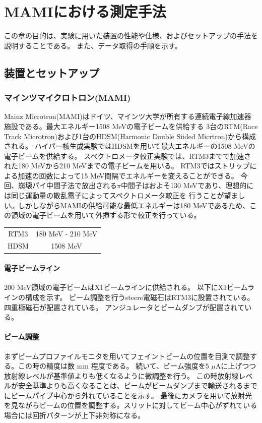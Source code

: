 \documentclass[a4paper,11pt,uplatex]{jsbook}
\begin{document}
\chapter{MAMIにおける測定手法}
この章の目的は、実験に用いた装置の性能や仕様、およびセットアップの手法を説明することである。
また、データ取得の手順を示す。
\section{装置とセットアップ}
\subsection{マインツマイクロトロン(MAMI)}
Mainz Microtron(MAMI)はドイツ、マインツ大学が所有する連続電子線加速器施設である。最大エネルギー1508 MeVの電子ビームを供給する
3台のRTM(Race Track Microtron)および1台のHDSM(Harmonic Double Siided Micrtron)から構成される。
ハイパー核生成実験ではHDSMを用いて最大エネルギーの1508 MeVの電子ビームを供給する。
スペクトロメータ較正実験では、RTM3までで加速された180 MeVから210 MeVまでの電子ビームを用いる。
RTM3ではストリップによる加速の回数によって15 MeV間隔でエネルギーを変えることができる。
今回、崩壊パイ中間子法で放出される$\pi$中間子はおよそ130 MeVであり、理想的には同じ運動量の散乱電子によってスペクトロメータ較正を
行うことが望ましい。しかしながらMAMIの供給可能な最低エネルギーは180 MeVであるため、この領域の電子ビームを用いて外挿する形で較正を行っている。
\begin{table}
  \begin{tabular}{cc}
    \hline
    RTM3 & 180 MeV - 210 MeV \\
    HDSM & 1508 MeV \\
    \hline
  \end{tabular}
\end{table}

\subsubsection{電子ビームライン}
200 MeV領域の電子ビームはX1ビームラインに供給される。
以下にX1ビームラインの構成を示す。
ビーム調整を行うsteere電磁石はRTM3に設置されている。
四重極磁石が配置されている。
アンジュレータとビームダンプが配置されている。


\subsubsection{ビーム調整}
まずビームプロファイルモニタを用いてフェイントビームの位置を目測で調整する。この時の精度は数 mm 程度である。
続いて、ビーム強度を5 $\mu\text{A}$に上げつつ放射線レベルが基準値よりも低くなるように微調整を行う。
この時放射線レベルが安全基準よりも高くなることは、ビームがビームダンプまで輸送されるまでにビームパイプ中心から外れていることを示す。
最後にカメラを用いて放射光を見ながらビームの位置を調整する。スリットに対してビーム中心がずれている場合には回折パターンが上下非対称になる。
\end{document}
